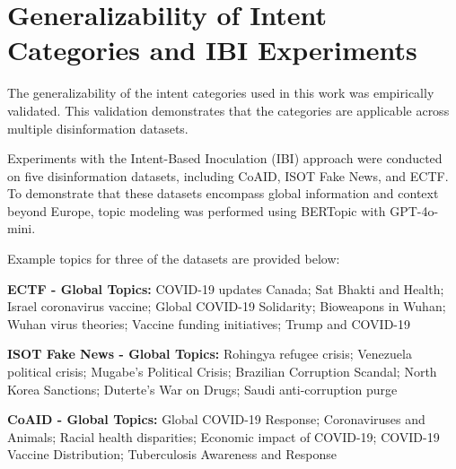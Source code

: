 \documentclass[11pt]{article}
\begin{document}
\section{Generalizability of Intent Categories and IBI Experiments}

The generalizability of the intent categories used in this work was empirically validated. This validation demonstrates that the categories are applicable across multiple disinformation datasets.


Experiments with the Intent-Based Inoculation (IBI) approach were conducted on five disinformation datasets, including CoAID, ISOT Fake News, and ECTF. To demonstrate that these datasets encompass global information and context beyond Europe, topic modeling was performed using BERTopic with GPT-4o-mini.  

Example topics for three of the datasets are provided below:

\textbf{ECTF - Global Topics:}  
COVID-19 updates Canada; Sat Bhakti and Health; Israel coronavirus vaccine; Global COVID-19 Solidarity; Bioweapons in Wuhan; Wuhan virus theories; Vaccine funding initiatives; Trump and COVID-19

\textbf{ISOT Fake News - Global Topics:}  
Rohingya refugee crisis; Venezuela political crisis; Mugabe's Political Crisis; Brazilian Corruption Scandal; North Korea Sanctions; Duterte's War on Drugs; Saudi anti-corruption purge

\textbf{CoAID - Global Topics:}  
Global COVID-19 Response; Coronaviruses and Animals; Racial health disparities; Economic impact of COVID-19; COVID-19 Vaccine Distribution; Tuberculosis Awareness and Response
\end{document}
